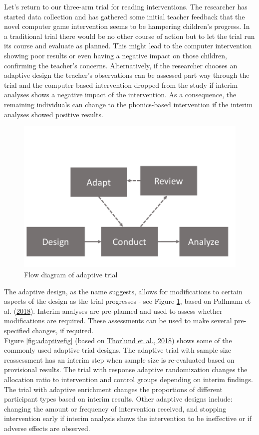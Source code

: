 \documentclass{krantz}
\begin{document}
Let's return to our three-arm trial for reading interventions. The researcher has started data collection and has gathered some initial teacher feedback that the novel computer game intervention seems to be hampering children's progress. In a traditional trial there would be no other course of action but to let the trial run its course and evaluate as planned. This might lead to the computer intervention showing poor results or even having a negative impact on those children, confirming the teacher's concerns. Alternatively, if the researcher chooses an adaptive design the teacher's observations can be assessed part way through the trial and the computer based intervention dropped from the study if interim analyses shows a negative impact of the intervention. As a consequence, the remaining individuals can change to the phonics-based intervention if the interim analyses showed positive results.

\begin{figure}

{\centering \includegraphics[width=0.75\linewidth]{images_bw/adaptive_flow} 

}

\caption{Flow diagram of adaptive trial}\label{fig:adaptiveflow}
\end{figure}

The adaptive design, as the name suggests, allows for modifications to certain aspects of the design as the trial progresses - see Figure \ref{fig:adaptiveflow}, based on Pallmann et al. (\protect\hyperlink{ref-pallmann2018}{2018}). Interim analyses are pre-planned and used to assess whether modifications are required. These assessments can be used to make several pre-specified changes, if required.\\
Figure \ref{fig:adaptivefig} (based on \protect\hyperlink{ref-thorlund2018}{Thorlund et al., 2018}) shows some of the commonly used adaptive trial designs. The adaptive trial with sample size reassessment has an interim step when sample size is re-evaluated based on provisional results. The trial with response adaptive randomization changes the allocation ratio to intervention and control groups depending on interim findings. The trial with adaptive enrichment changes the proportions of different participant types based on interim results. Other adaptive designs include: changing the amount or frequency of intervention received, and stopping intervention early if interim analysis shows the intervention to be ineffective or if adverse effects are observed.
\end{document}
